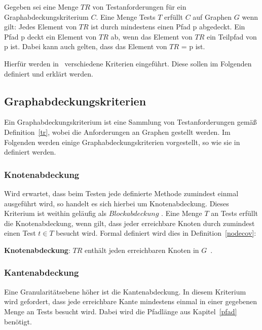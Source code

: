 \begin{definition}
    Gegeben sei eine Menge $TR$ von Testanforderungen für ein Graphabdeckungskriterium $C$.
    Eine Menge Tests $T$ erfüllt $C$ auf Graphen $G$ wenn gilt: Jedes Element von $TR$ ist durch mindestens einen Pfad p abgedeckt.
    Ein Pfad p deckt ein Element von $TR$ ab, wenn das Element von $TR$ ein Teilpfad von p ist.
    Dabei kann auch gelten, dass das Element von $TR$ = p ist.
    \cite[vgl. Def. 2.32]{software-testing}
    \label{graphcov}
\end{definition}

Hierfür werden in~\cite{software-testing} verschiedene Kriterien eingeführt.
Diese sollen im Folgenden definiert und erklärt werden.

\subsection{Graphabdeckungskriterien}

Ein Graphabdeckungskriterium ist eine Sammlung von Testanforderungen gemäß Definition~\ref{tr}, wobei die Anforderungen an Graphen gestellt werden.
Im Folgenden werden einige Graphabdeckungskriterien vorgestellt, so wie sie in~\cite{software-testing} definiert werden.

\subsubsection{Knotenabdeckung}

Wird erwartet, dass beim Testen jede definierte Methode zumindest einmal ausgeführt wird, so handelt es sich hierbei um Knotenabdeckung.
Dieses Kriterium ist weithin geläufig als $Blockabdeckung$ \cite[vgl. 2.2.1]{software-testing}.
Eine Menge $T$ an Tests erfüllt die Knotenabdeckung, wenn gilt, dass jeder erreichbare Knoten durch zumindest einen Test $t \in T$ besucht wird.
Formal definiert wird dies in Definition~\ref{nodecov}:

\begin{definition}
    \textbf{Knotenabdeckung}: $TR$ enthält jeden erreichbaren Knoten in $G$~\cite[vgl. Criterion 2.1]{software-testing}.
    \label{nodecov}
\end{definition}


\subsubsection{Kantenabdeckung}
\label{kantenabdeck}
Eine Granularitätsebene höher ist die Kantenabdeckung.
In diesem Kriterium wird gefordert, dass jede erreichbare Kante mindestens einmal in einer gegebenen Menge an Tests besucht wird.
Dabei wird die Pfadlänge aus Kapitel~\ref{pfad} benötigt.

